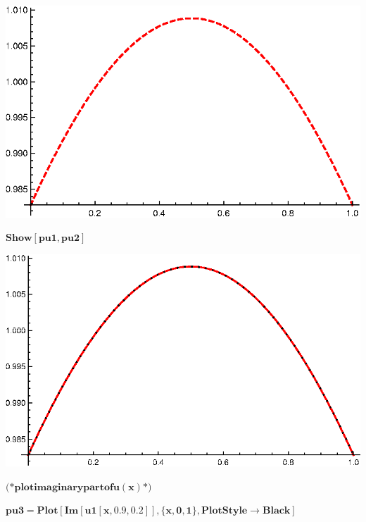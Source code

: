 {\includegraphics{chapters/appendices/KP_Mathematica/Kronig_Penney_model_transfer_matrix_gr9.eps}

\begin{doublespace}
\noindent\(\pmb{\text{Show}[\text{pu1},\text{pu2}]}\)
\end{doublespace}

\includegraphics{chapters/appendices/KP_Mathematica/Kronig_Penney_model_transfer_matrix_gr10.eps}

\begin{doublespace}
\noindent\(\pmb{\text{(*} \text{plot} \text{imaginary} \text{part} \text{of} u(x) \text{*)}}\)
\end{doublespace}

\begin{doublespace}
\noindent\(\pmb{\text{pu3}=\text{Plot}[\text{Im}[\text{u1}[x,0.9,0.2]],\{x,0,1\},\text{PlotStyle}\to \text{Black}]}\)
\end{doublespace}

}
